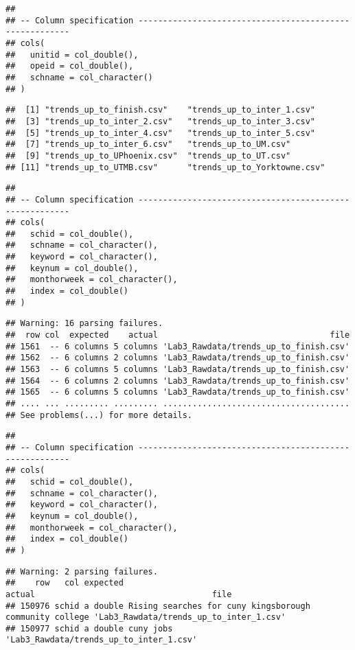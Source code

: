 \documentclass[
]{article}
\begin{document}
\begin{verbatim}
## 
## -- Column specification --------------------------------------------------------
## cols(
##   unitid = col_double(),
##   opeid = col_double(),
##   schname = col_character()
## )
\end{verbatim}

\begin{verbatim}
##  [1] "trends_up_to_finish.csv"    "trends_up_to_inter_1.csv"  
##  [3] "trends_up_to_inter_2.csv"   "trends_up_to_inter_3.csv"  
##  [5] "trends_up_to_inter_4.csv"   "trends_up_to_inter_5.csv"  
##  [7] "trends_up_to_inter_6.csv"   "trends_up_to_UM.csv"       
##  [9] "trends_up_to_UPhoenix.csv"  "trends_up_to_UT.csv"       
## [11] "trends_up_to_UTMB.csv"      "trends_up_to_Yorktowne.csv"
\end{verbatim}

\begin{verbatim}
## 
## -- Column specification --------------------------------------------------------
## cols(
##   schid = col_double(),
##   schname = col_character(),
##   keyword = col_character(),
##   keynum = col_double(),
##   monthorweek = col_character(),
##   index = col_double()
## )
\end{verbatim}

\begin{verbatim}
## Warning: 16 parsing failures.
##  row col  expected    actual                                   file
## 1561  -- 6 columns 5 columns 'Lab3_Rawdata/trends_up_to_finish.csv'
## 1562  -- 6 columns 2 columns 'Lab3_Rawdata/trends_up_to_finish.csv'
## 1563  -- 6 columns 5 columns 'Lab3_Rawdata/trends_up_to_finish.csv'
## 1564  -- 6 columns 2 columns 'Lab3_Rawdata/trends_up_to_finish.csv'
## 1565  -- 6 columns 5 columns 'Lab3_Rawdata/trends_up_to_finish.csv'
## .... ... ......... ......... ......................................
## See problems(...) for more details.
\end{verbatim}

\begin{verbatim}
## 
## -- Column specification --------------------------------------------------------
## cols(
##   schid = col_double(),
##   schname = col_character(),
##   keyword = col_character(),
##   keynum = col_double(),
##   monthorweek = col_character(),
##   index = col_double()
## )
\end{verbatim}

\begin{verbatim}
## Warning: 2 parsing failures.
##    row   col expected                                                  actual                                    file
## 150976 schid a double Rising searches for cuny kingsborough community college 'Lab3_Rawdata/trends_up_to_inter_1.csv'
## 150977 schid a double cuny jobs                                               'Lab3_Rawdata/trends_up_to_inter_1.csv'
\end{verbatim}
\end{document}
